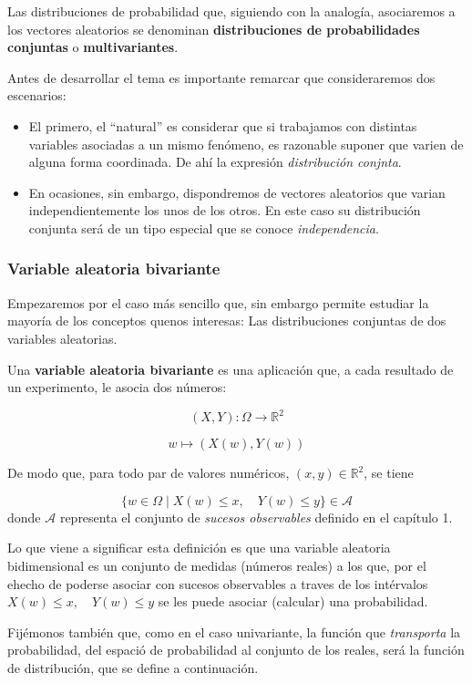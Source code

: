 \documentclass[
]{article}
\begin{document}
Las distribuciones de probabilidad que, siguiendo con la analogía, asociaremos a los vectores aleatorios se denominan \textbf{distribuciones de probabilidades conjuntas} o \textbf{multivariantes}.

Antes de desarrollar el tema es importante remarcar que consideraremos dos escenarios:

\begin{itemize}
\item
  El primero, el ``natural'' es considerar que si trabajamos con distintas variables asociadas a un mismo fenómeno, es razonable suponer que varien de alguna forma coordinada. De ahí la expresión \emph{distribución conjnta}.
\item
  En ocasiones, sin embargo, dispondremos de vectores aleatorios que varian independientemente los unos de los otros. En este caso su distribución conjunta será de un tipo especial que se conoce \emph{independencia}.
\end{itemize}

\subsubsection{Variable aleatoria bivariante}\label{variable-aleatoria-bivariante}

Empezaremos por el caso más sencillo que, sin embargo permite estudiar la mayoría de los conceptos quenos interesas: Las distribuciones conjuntas de dos variables aleatorias.

Una \textbf{variable aleatoria bivariante} es una aplicación que, a cada resultado de un experimento, le asocia dos números:

\[
(X, Y): \Omega \to \mathbb{R}^2
\]

\[
w \mapsto (X(w), Y(w))
\]

De modo que, para todo par de valores numéricos, \((x, y) \in \mathbb{R}^2\), se tiene

\[
\{w \in \Omega \mid X(w) \leq x,\quad Y(w) \leq y\} \in \mathcal{A}
\]
donde \(\mathcal{A}\) representa el conjunto de \emph{sucesos observables} definido en el capítulo 1.

Lo que viene a significar esta definición es que una variable aleatoria bidimensional es un conjunto de medidas (números reales) a los que, por el ehecho de poderse asociar con sucesos observables a traves de los intérvalos \(X(w) \leq x,\quad Y(w) \leq y\) se les puede asociar (calcular) una probabilidad.

Fijémonos también que, como en el caso univariante, la función que \emph{transporta} la probabilidad, del espació de probabilidad al conjunto de los reales, será la función de distribución, que se define a continuación.
\end{document}
